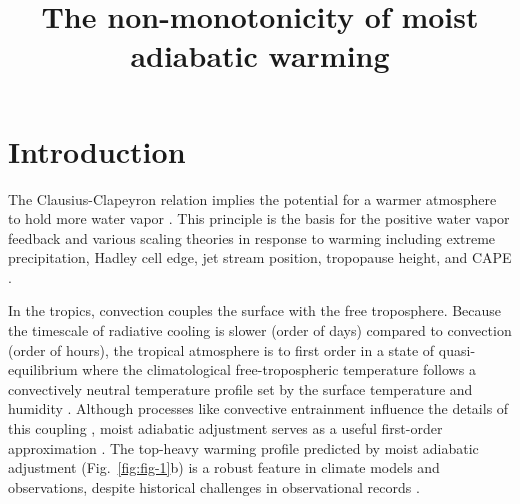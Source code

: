 \documentclass[draft]{ametsocV6.1}
\title{The non-monotonicity of moist adiabatic warming}
\affiliation{\aff{a}{Department of Geosciences, Union College, Schenectady New York, USA}}
\begin{document}
\maketitle

%
\section{Introduction}

The Clausius-Clapeyron relation implies the potential for a warmer atmosphere to hold more water vapor \citep{emanuel1994}. This principle is the basis for the positive water vapor feedback \citep{held2000a} and various scaling theories in response to warming including extreme precipitation, Hadley cell edge, jet stream position, tropopause height, and CAPE \citep{oGorman2015, shaw2016b, romps2016}. 

In the tropics, convection couples the surface with the free troposphere. Because the timescale of radiative cooling is slower (order of days) compared to convection (order of hours), the tropical atmosphere is to first order in a state of quasi-equilibrium where the climatological free-tropospheric temperature follows a convectively neutral temperature profile set by the surface temperature and humidity \cite{arakawa1974}. Although processes like convective entrainment influence the details of this coupling \citep{miyawaki2020, keil2021}, moist adiabatic adjustment serves as a useful first-order approximation \citep{held1993}. The top-heavy warming profile predicted by moist adiabatic adjustment (Fig.~\ref{fig:fig-1}b) is a robust feature in climate models and observations, despite historical challenges in observational records \citep{vallis2015, santer2005}.
\end{document}
